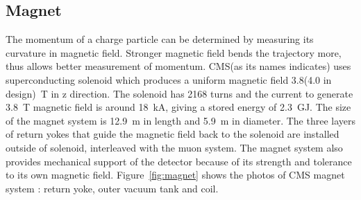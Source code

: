 %




\subsection{Magnet} 

The momentum of a charge particle can be determined by measuring 
its curvature in magnetic field. Stronger magnetic field bends   
the trajectory more, thus allows better measurement of momentum.
CMS(as its names indicates) uses superconducting solenoid 
which produces a uniform magnetic field  3.8(4.0 in design)~T 
in z direction. %
The solenoid has 2168 turns and the current to generate 3.8~T magnetic field  
is around 18~kA, giving a stored energy of 2.3~GJ. 
The size of the magnet system is 12.9~m in length and 5.9~m in diameter. 
The three layers of return yokes that guide the magnetic field back to the solenoid 
are installed outside of solenoid, interleaved with the muon system. 
The magnet system also provides mechanical support of the detector
because of its strength and tolerance to its own magnetic field. 
Figure~\ref{fig:magnet} shows the photos of CMS magnet system : 
return yoke, outer vacuum tank and coil. 

